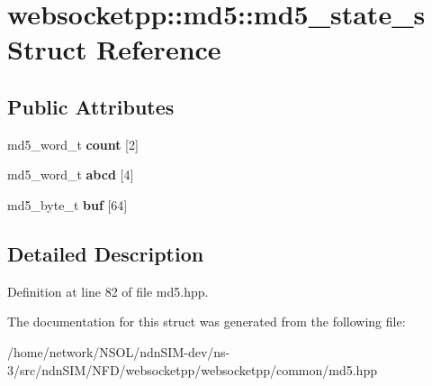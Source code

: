 \hypertarget{structwebsocketpp_1_1md5_1_1md5__state__s}{}\section{websocketpp\+:\+:md5\+:\+:md5\+\_\+state\+\_\+s Struct Reference}
\label{structwebsocketpp_1_1md5_1_1md5__state__s}
\subsection*{Public Attributes}
\begin{DoxyCompactItemize}
\item 
md5\+\_\+word\+\_\+t {\bfseries count} \mbox{[}2\mbox{]}\hypertarget{structwebsocketpp_1_1md5_1_1md5__state__s_a749f80b1f08f2e740e63a05a8821cf5c}{}\label{structwebsocketpp_1_1md5_1_1md5__state__s_a749f80b1f08f2e740e63a05a8821cf5c}

\item 
md5\+\_\+word\+\_\+t {\bfseries abcd} \mbox{[}4\mbox{]}\hypertarget{structwebsocketpp_1_1md5_1_1md5__state__s_a4579438de233e09db1f5994a341a3371}{}\label{structwebsocketpp_1_1md5_1_1md5__state__s_a4579438de233e09db1f5994a341a3371}

\item 
md5\+\_\+byte\+\_\+t {\bfseries buf} \mbox{[}64\mbox{]}\hypertarget{structwebsocketpp_1_1md5_1_1md5__state__s_a4d3bae1432efcd8e294b910ee01ef39a}{}\label{structwebsocketpp_1_1md5_1_1md5__state__s_a4d3bae1432efcd8e294b910ee01ef39a}

\end{DoxyCompactItemize}


\subsection{Detailed Description}


Definition at line 82 of file md5.\+hpp.



The documentation for this struct was generated from the following file\+:\begin{DoxyCompactItemize}
\item 
/home/network/\+N\+S\+O\+L/ndn\+S\+I\+M-\/dev/ns-\/3/src/ndn\+S\+I\+M/\+N\+F\+D/websocketpp/websocketpp/common/md5.\+hpp\end{DoxyCompactItemize}
